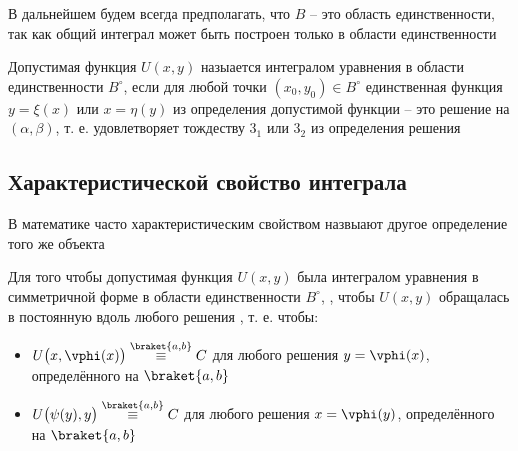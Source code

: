 В дальнейшем будем всегда предполагать, что $ B $ -- это область единственности, так как общий интеграл может быть построен только в области единственности

\begin{definition}
    Допустимая функция $ U(x, y) $ назыается интегралом уравнения  в области единственности $ B^\circ $, если для любой точки $ (x_0, y_0) \in B^\circ $ единственная функция $ y = \xi(x) $ или $ x = \eta(y) $ из определения допустимой функции -- это решение  на $ (\alpha, \beta) $, т. е. удовлетворяет тождеству $ 3_1 $ или $ 3_2 $ из определения решения
\end{definition}

\subsection{Характеристической свойство интеграла}

\begin{note}
	В математике часто характеристическим свойством назвыают другое определение того же объекта
\end{note}

\begin{theorem}
    Для того чтобы допустимая функция $ U(x, y) $ была интегралом уравнения в симметричной форме  в области единственности $ B^\circ $, , чтобы $ U(x, y) $ обращалась в постоянную вдоль любого решения , т. е. чтобы:
    \begin{itemize}
        \item $ U \big( x, \vphi(x) \big) \overset{\braket{a, b}}\equiv C $ для любого решения $ y = \vphi(x) $, определённого на $ \braket{a, b} $
        \item $ U \big( \psi(y), y \big) \overset{\braket{a, b}}\equiv C $ для любого решения $ x = \vphi(y) $, определённого на $ \braket{a, b} $
    \end{itemize}
\end{theorem}


